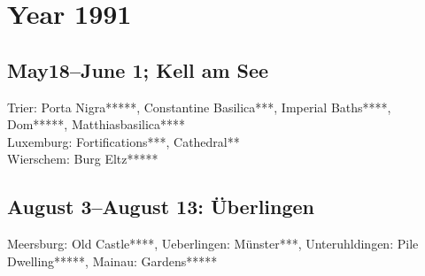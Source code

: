 \chapter{Year 1991}
\label{1991}

\section{May18--June 1; Kell am See}
\label{1991:Kell}


Trier: Porta Nigra*****, Constantine Basilica***, Imperial Baths****, Dom*****, Matthiasbasilica****\\
Luxemburg: Fortifications***, Cathedral**\\
Wierschem: Burg Eltz*****\\

\section{August 3--August 13: \"Uberlingen}
\label{1991:Uberlingen}


Meersburg: Old Castle****, Ueberlingen: M\"unster***, Unteruhldingen: Pile Dwelling*****, Mainau: Gardens*****